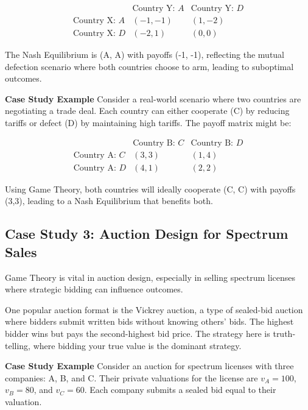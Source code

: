 \documentclass[12pt]{book} %
\begin{document}
\begin{equation}
\begin{array}{c|cc}
 & \text{Country Y: } A & \text{Country Y: } D \\
\hline
\text{Country X: } A & (-1,-1) & (1,-2) \\
\text{Country X: } D & (-2,1) & (0,0)
\end{array}
\end{equation}

The Nash Equilibrium is (A, A) with payoffs (-1, -1), reflecting the mutual defection scenario where both countries choose to arm, leading to suboptimal outcomes.

\textbf{Case Study Example}
Consider a real-world scenario where two countries are negotiating a trade deal. Each country can either cooperate (C) by reducing tariffs or defect (D) by maintaining high tariffs. The payoff matrix might be:

\begin{equation}
\begin{array}{c|cc}
 & \text{Country B: } C & \text{Country B: } D \\
\hline
\text{Country A: } C & (3,3) & (1,4) \\
\text{Country A: } D & (4,1) & (2,2)
\end{array}
\end{equation}

Using Game Theory, both countries will ideally cooperate (C, C) with payoffs (3,3), leading to a Nash Equilibrium that benefits both.

\subsection{Case Study 3: Auction Design for Spectrum Sales}
Game Theory is vital in auction design, especially in selling spectrum licenses where strategic bidding can influence outcomes.

One popular auction format is the Vickrey auction, a type of sealed-bid auction where bidders submit written bids without knowing others' bids. The highest bidder wins but pays the second-highest bid price. The strategy here is truth-telling, where bidding your true value is the dominant strategy.

\textbf{Case Study Example}
Consider an auction for spectrum licenses with three companies: A, B, and C. Their private valuations for the license are $v_A = 100$, $v_B = 80$, and $v_C = 60$. Each company submits a sealed bid equal to their valuation.
\end{document}
